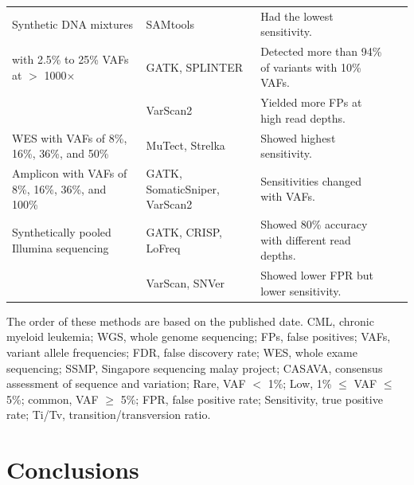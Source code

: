 \documentclass[a4,center,fleqn]{NAR}
\begin{document}
\begin{landscape}
\begin{table}[htbp]
\begin{threeparttable}
\begin{tabular}{rlrr}
    \midrule
    \multicolumn{1}{l}{Synthetic DNA mixtures } & SAMtools & \multicolumn{1}{l}{Had the lowest sensitivity.} &~\citep{Spencer2014}\\
    \multicolumn{1}{l}{with 2.5\% to 25\% VAFs at $>$ 1000$\times$ } & GATK,  SPLINTER & \multicolumn{1}{l}{Detected more than 94\% of variants with 10\% VAFs.} &  \\
          & VarScan2 & \multicolumn{1}{l}{Yielded more FPs at high read depths.} &  \\

    \midrule
    \multicolumn{1}{l}{WES with VAFs of 8\%, 16\%, 36\%, and 50\%} & MuTect, Strelka & \multicolumn{1}{l}{Showed highest sensitivity.} &~\citep{Xu2014}\\
    \multicolumn{1}{l}{Amplicon with VAFs of 8\%, 16\%, 36\%, and 100\%} & GATK, SomaticSniper, VarScan2 & \multicolumn{1}{l}{Sensitivities changed with VAFs.} &  \\

    \midrule
    \multicolumn{1}{l}{Synthetically pooled Illumina sequencing} & GATK, CRISP, LoFreq & \multicolumn{1}{l}{Showed 80\% accuracy with different read depths.} &~\citep{Huang2015} \\
          & VarScan, SNVer  & \multicolumn{1}{l}{Showed lower FPR but lower sensitivity.} &  \\

    \bottomrule
    \end{tabular}
   \begin{tablenotes}
	\item The order of these methods are based on the published date.
CML, chronic myeloid leukemia;
WGS, whole genome sequencing;
FPs, false positives;
VAFs, variant allele frequencies;
FDR, false discovery rate;
WES, whole exame sequencing;
SSMP, Singapore sequencing malay project;
CASAVA, consensus assessment of sequence and variation;
Rare, VAF $<$ 1\%; Low, 1\% $\leqslant$ VAF $\leqslant$  5\%; common, VAF $\geqslant$ 5\%;
FPR, false positive rate;
Sensitivity, true positive rate;
Ti/Tv, transition/transversion ratio.
    \end{tablenotes}
\end{threeparttable}
\end{table}
\end{landscape}




\section{Conclusions}
\end{document}
